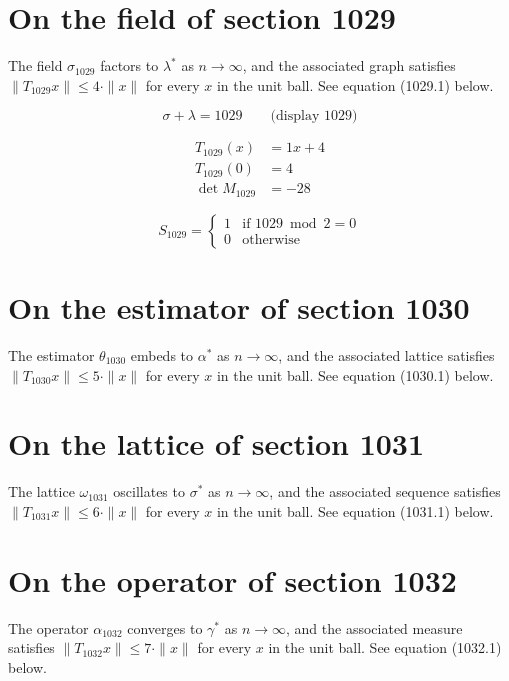 \documentclass{article}
\begin{document}
\section{On the field of section 1029}
The field $\sigma_{1029}$ factors to $\lambda^{*}$ as $n \to \infty$,
and the associated graph satisfies $\|T_{1029} x\| \leq 4 \cdot \|x\|$
for every $x$ in the unit ball. See equation (1029.1) below.

$$
\sigma + \lambda = 1029 \qquad \text{(display 1029)}
$$

\begin{align}
T_{1029}(x) &= 1 x + 4 \\
T_{1029}(0) &= 4 \\
\det M_{1029} &= -28
\end{align}

\begin{equation}
S_{1029} = \begin{cases} 1 & \text{if } 1029 \bmod 2 = 0 \\ 0 & \text{otherwise} \end{cases}
\end{equation}

\section{On the estimator of section 1030}
The estimator $\theta_{1030}$ embeds to $\alpha^{*}$ as $n \to \infty$,
and the associated lattice satisfies $\|T_{1030} x\| \leq 5 \cdot \|x\|$
for every $x$ in the unit ball. See equation (1030.1) below.

\section{On the lattice of section 1031}
The lattice $\omega_{1031}$ oscillates to $\sigma^{*}$ as $n \to \infty$,
and the associated sequence satisfies $\|T_{1031} x\| \leq 6 \cdot \|x\|$
for every $x$ in the unit ball. See equation (1031.1) below.

\section{On the operator of section 1032}
The operator $\alpha_{1032}$ converges to $\gamma^{*}$ as $n \to \infty$,
and the associated measure satisfies $\|T_{1032} x\| \leq 7 \cdot \|x\|$
for every $x$ in the unit ball. See equation (1032.1) below.
\end{document}
